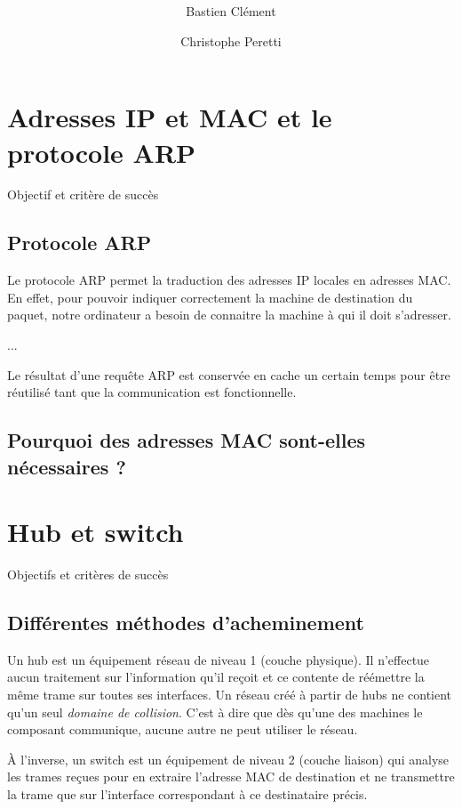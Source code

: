 \documentclass[11pt,a4paper]{article}
\author{Bastien Clément \and Christophe Peretti}
\title{{\normalsize \doccourse} \\ \doctitle }
\begin{document}
\maketitle
\vspace{1em}

\section{Adresses IP et MAC et le protocole ARP}

Objectif et critère de succès

\subsection{Protocole ARP}

Le protocole ARP permet la traduction des adresses IP locales en adresses MAC. En effet, pour pouvoir indiquer correctement la machine de destination du paquet, notre ordinateur a besoin de connaitre la machine à qui il doit s'adresser.

...

Le résultat d'une requête ARP est conservée en cache un certain temps pour être réutilisé tant que la communication est fonctionnelle.

\subsection{Pourquoi des adresses MAC sont-elles nécessaires ?}

\section{Hub et switch}

Objectifs et critères de succès

\subsection{Différentes méthodes d'acheminement}

Un hub est un équipement réseau de niveau 1 (couche physique). Il n'effectue aucun traitement sur l'information qu'il reçoit et ce contente de réémettre la même trame sur toutes ses interfaces. Un réseau créé à partir de hubs ne contient qu'un seul \textit{domaine de collision}. C'est à dire que dès qu'une des machines le composant communique, aucune autre ne peut utiliser le réseau.

À l'inverse, un switch est un équipement de niveau 2 (couche liaison) qui analyse les trames reçues pour en extraire l'adresse MAC de destination et ne transmettre la trame que sur l'interface correspondant à ce destinataire précis.
\end{document}
